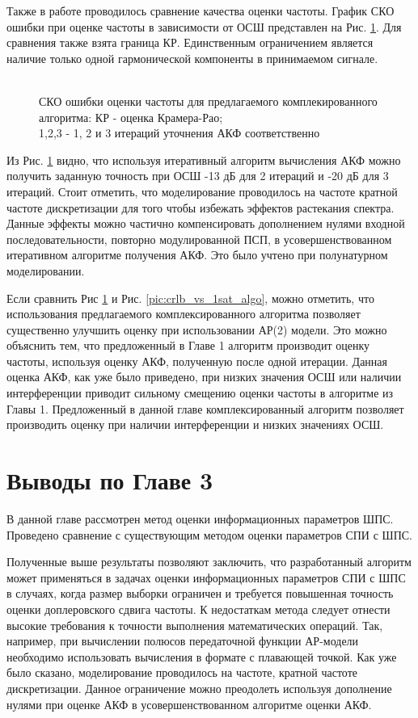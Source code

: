 Также в работе проводилось сравнение качества оценки частоты. График СКО ошибки при оценке частоты в зависимости от ОСШ представлен на Рис. \ref{pic:crlb_vs_algorithm}.
Для сравнения также взята граница КР.  Единственным ограничением является наличие только одной гармонической компоненты в принимаемом сигнале.
\begin{figure}[h]
\center{}
	\caption{\\СКО ошибки оценки частоты для предлагаемого комплекированного алгоритма: КР - оценка Крамера-Рао; \\1,2,3 - 1, 2 и 3 итераций уточнения АКФ соответственно}
	\label{pic:crlb_vs_algorithm}
\end{figure}
Из Рис. \ref{pic:crlb_vs_algorithm} видно, что используя итеративный алгоритм вычисления АКФ можно получить заданную точность
при ОСШ -13 дБ для 2 итераций и -20 дБ для 3 итераций. Стоит отметить, что моделирование проводилось на частоте кратной частоте дискретизации для
того чтобы избежать эффектов растекания спектра. Данные эффекты можно частично компенсировать дополнением нулями входной последовательности, повторно модулированной ПСП, в
усовершенствованном итеративном алгоритме получения АКФ. Это было учтено при полунатурном моделировании.

Если сравнить Рис \ref{pic:crlb_vs_algorithm} и Рис. \ref{pic:crlb_vs_1sat_algo}, можно отметить, что использования предлагаемого комплексированного алгоритма
позволяет существенно улучшить оценку при использовании АР(2) модели. Это можно объяснить тем, что предложенный в Главе 1 алгоритм производит оценку частоты, используя
оценку АКФ, полученную после одной итерации. Данная оценка АКФ, как уже было приведено, при низких значения ОСШ или наличии интерференции приводит сильному смещению оценки
частоты в алгоритме из Главы 1. Предложенный в данной главе комплексированный алгоритм позволяет производить оценку при наличии интерференции и низких значениях ОСШ.

\section{Выводы по Главе 3}

В данной главе рассмотрен метод оценки информационных параметров ШПС. Проведено сравнение с существующим методом оценки параметров СПИ с ШПС.

Полученные выше результаты позволяют заключить, что разработанный алгоритм может применяться в задачах оценки информационных параметров СПИ с ШПС в случаях, когда размер выборки ограничен и
требуется повышенная точность оценки доплеровского сдвига частоты. К недостаткам метода следует отнести высокие требования к точности выполнения математических операций.
Так, например, при вычислении полюсов передаточной функции АР-модели необходимо использовать вычисления в формате с плавающей точкой. 
Как уже было сказано, моделирование проводилось на частоте, кратной частоте дискретизации. Данное ограничение можно преодолеть используя дополнение нулями при оценке АКФ
в усовершенствованном алгоритме оценки АКФ.

